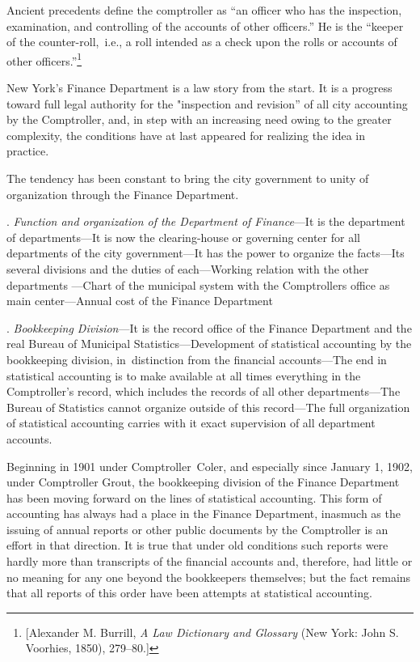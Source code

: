 \documentclass[twoside,symmetric,nobib,justified]{tufte-book}
\begin{document}
Ancient precedents define the comptroller as ``an officer who has the
inspection, examination, and controlling of the accounts of other
officers.'' He is the ``keeper of the counter-roll,~i.e., a roll
intended as a check upon the rolls or accounts of other
officers.''\footnote{{[}Alexander M. Burrill, \emph{A Law Dictionary and
  Glossary} (New York: John S. Voorhies, 1850), 279--80.{]}}~

New York's Finance Department is a law story from the start. It is a
progress toward full legal authority for the "inspection and revision''
of all city accounting by the Comptroller, and, in step with an
increasing need owing to the greater complexity, the conditions have at
last appeared for realizing the idea in practice.~

The tendency has been constant to bring the city government to unity of
organization through the Finance Department.~

\vspace{.15in}

\enlargethispage{\baselineskip}

.\emph{ Function and organization of the Department of Finance}---It is
the department of departments---It is now the clearing-house or
governing center for all departments of the city government---It has the
power to organize the facts---Its several divisions and the duties of
each---Working relation with the other departments ---Chart of the
municipal system with the Comptroller\textquotesingle s office as main
center---Annual cost of the Finance Department~

\vspace{.15in}

. \emph{Bookkeeping Division}---It is the record office of the Finance
Department and the real Bureau of Municipal Statistics---Development of
statistical accounting by the bookkeeping division, in~distinction from
the financial accounts---The end in statistical accounting is to make
available at all times everything in the Comptroller's record, which
includes the records of all other departments---The Bureau of Statistics
cannot organize outside of this record---The full organization of
statistical accounting carries with it exact supervision of all
department accounts.~

Beginning in 1901 under Comptroller~Coler, and especially since January
1, 1902, under Comptroller Grout, the bookkeeping division of the
Finance Department has been moving forward on the lines of statistical
accounting. This form of accounting has always had a place in the
Finance Department, inasmuch as the issuing of annual reports or other
public documents by the Comptroller is an effort in that direction. It
is true that under old conditions such reports were hardly more than
transcripts of the financial accounts and, therefore, had little or no
meaning for any one beyond the bookkeepers themselves; but the fact
remains that all reports of this order have been attempts at statistical
accounting.~~
\end{document}

